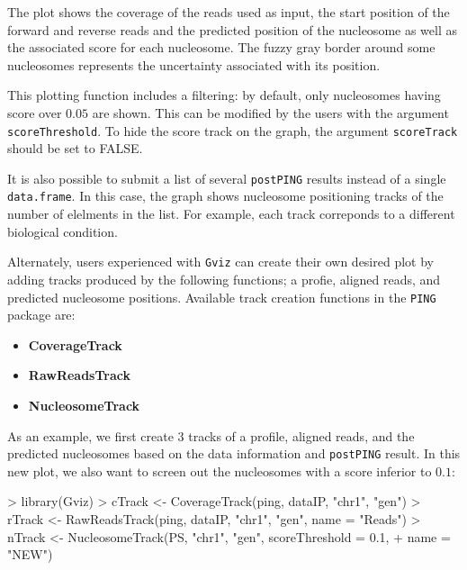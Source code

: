 \documentclass[11pt]{article}
\begin{document}
The plot shows the coverage of the reads used as input, the start position of the forward and reverse reads and the predicted position of the nucleosome as well as the associated score for each nucleosome. The fuzzy gray border around some nucleosomes represents the uncertainty associated with its position.

This plotting function includes a filtering: by default, only nucleosomes having score over $0.05$ are shown. This can be modified by the users with the argument \texttt{scoreThreshold}. To hide the score track on the graph, the argument \texttt{scoreTrack} should be set to FALSE.

It is also possible to submit a list of several \texttt{postPING} results instead of a single \texttt{data.frame}. In this case, the graph shows nucleosome positioning tracks of the number of elelments in the list. For example, each track correponds to a different biological condition. 

\vspace{10pt}
Alternately, users experienced with \texttt{Gviz} can create their own desired plot by adding tracks produced by the following functions; a profie, aligned reads, and predicted nucleosome positions. Available track creation functions in the \texttt{PING} package are:

\begin{itemize}
\item \textbf{CoverageTrack}
\item \textbf{RawReadsTrack}
\item \textbf{NucleosomeTrack}
\end{itemize}

As an example, we first create $3$ tracks of a profile, aligned reads, and the predicted nucleosomes based on the data information and \texttt{postPING} result. In this new plot, we also want to screen out the nucleosomes with a score inferior to $0.1$:
\begin{Schunk}
\begin{Sinput}
> library(Gviz)
> cTrack <- CoverageTrack(ping, dataIP, "chr1", "gen")
> rTrack <- RawReadsTrack(ping, dataIP, "chr1", "gen", name = "Reads")
> nTrack <- NucleosomeTrack(PS, "chr1", "gen", scoreThreshold = 0.1, 
+     name = "NEW")
\end{Sinput}
\end{Schunk}
\end{document}
